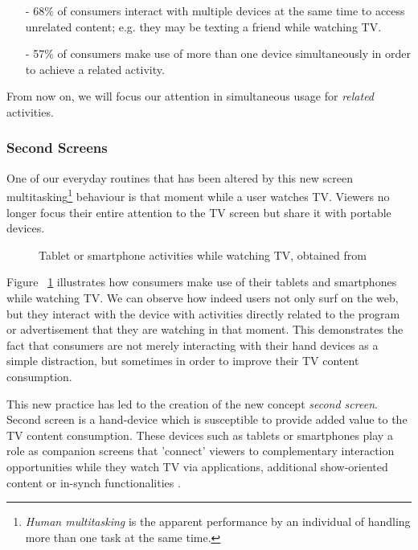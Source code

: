 \documentclass{acm_proc_article-sp}
\begin{document}
\begin{itemize}
  \item[-] 68\% of consumers interact with multiple devices at the same time to access unrelated content; e.g. they may be texting a friend while watching TV. 
  \item[-] 57\% of consumers make use of more than one device simultaneously in order to achieve a related activity. 
\end{itemize}

From now on, we will focus our attention in simultaneous usage for \textit{related} activities.
 	
\subsubsection{Second Screens}

One of our everyday routines that has been altered by this new screen multitasking\footnote{\textit{Human multitasking} is the apparent performance by an individual of handling more than one task at the same time.} behaviour is that moment while a user watches TV. Viewers no longer focus their entire attention to the TV screen but share it with portable devices. 

\begin{figure}[!htb]
	\centering
	\caption{Tablet or smartphone activities while watching TV, obtained from \cite{nielsentv}}
	\label{fig:nielsengraph}
\end{figure}

Figure ~\ref{fig:nielsengraph} illustrates how consumers make use of their tablets and smartphones while watching TV. We can observe how indeed users not only surf on the web, but they interact with the device with activities directly related to the program or advertisement that they are watching in that moment. This demonstrates the fact that consumers are not merely interacting with their hand devices as a simple distraction, but sometimes in order to improve their TV content consumption. 

This new practice has led to the creation of the new concept \textit{second screen}. Second screen is a hand-device which is susceptible to provide added value to the TV content consumption. These devices such as tablets or smartphones play a role as companion
screens that 'connect' viewers to complementary interaction
opportunities while they watch TV via applications, additional
show-oriented content or in-synch functionalities \cite{evolumedia2}. 
\end{document}
